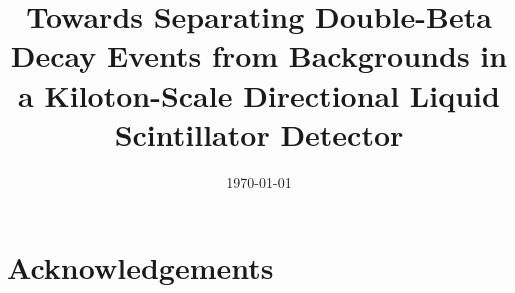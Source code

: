 



\graphicspath{{plots/}}

\linenumbers
{}
%

\title{Towards Separating Double-Beta Decay Events from Backgrounds in a Kiloton-Scale Directional Liquid Scintillator Detector}


\begin{abstract}

\end{abstract}

\date{\today}

\maketitle

\newpage
\tableofcontents
\newpage

\linenumbers\relax %




\clearpage %

\clearpage %


\clearpage %


\clearpage %


\clearpage %

\section*{Acknowledgements}



%





